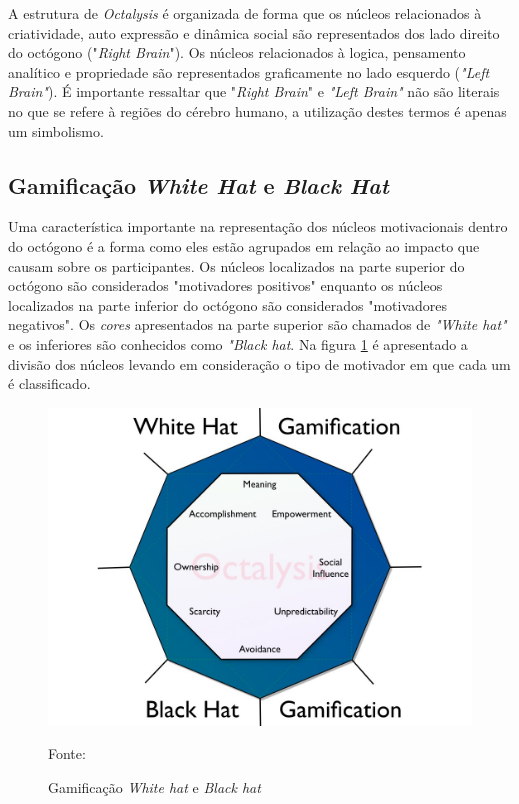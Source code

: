 A estrutura de \textit{Octalysis} é organizada de forma que os núcleos relacionados à criatividade, auto expressão e dinâmica social são
representados dos lado direito do octógono ("\textit{Right Brain}"). Os núcleos relacionados à logica, pensamento analítico e propriedade são representados graficamente
no lado esquerdo (\textit{"Left Brain"}). É importante ressaltar que "\textit{Right Brain}" e \textit{"Left Brain"} não são literais no que se refere
à regiões do cérebro humano, a utilização destes termos é apenas um simbolismo.

\subsection{Gamificação \textit{White Hat} e \textit{Black Hat}}

Uma característica importante na representação dos núcleos motivacionais dentro do octógono é a forma como eles estão agrupados em relação ao impacto
que causam sobre os participantes. Os núcleos localizados na parte superior do octógono são considerados "motivadores positivos" enquanto os núcleos localizados
na parte inferior do octógono são considerados "motivadores negativos". Os \textit{cores} apresentados na parte superior são chamados de \textit{"White hat"} e os inferiores
são conhecidos como \textit{"Black hat}. Na figura \ref{octogono} é apresentado a divisão dos núcleos levando em consideração o tipo de motivador em que cada um
é classificado.

\begin{figure}[h]
	\centering
	\includegraphics[keepaspectratio=true,scale=0.28]{figuras/octogono.jpg}
	\caption{Gamificação \textit{White hat} e \textit{Black hat}}
	Fonte: \cite{chou2017actionable}
	\label{octogono}
\end{figure}

